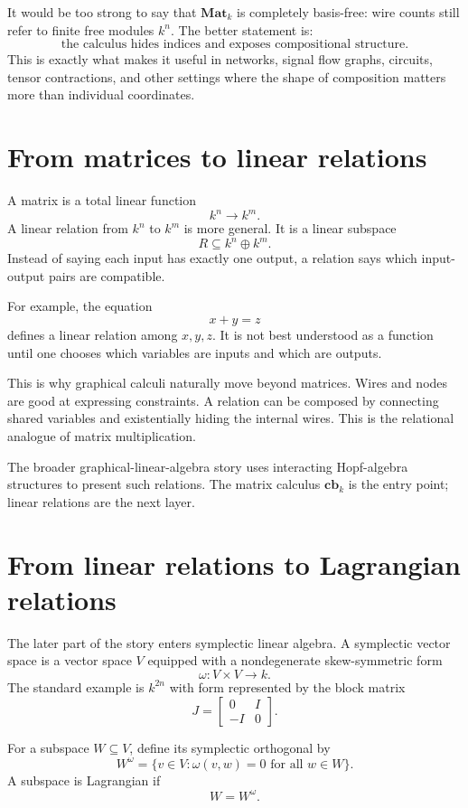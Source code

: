 It would be too strong to say that \(\mathbf{Mat}_k\) is completely basis-free: wire counts still refer to finite free modules \(k^n\).  The better statement is:
\[
  \text{the calculus hides indices and exposes compositional structure.}
\]
This is exactly what makes it useful in networks, signal flow graphs, circuits, tensor contractions, and other settings where the shape of composition matters more than individual coordinates.

\section{From matrices to linear relations}

A matrix is a total linear function
\[
  k^n\to k^m.
\]
A linear relation from \(k^n\) to \(k^m\) is more general.  It is a linear subspace
\[
  R\subseteq k^n\oplus k^m.
\]
Instead of saying each input has exactly one output, a relation says which input-output pairs are compatible.

For example, the equation
\[
  x+y=z
\]
defines a linear relation among \(x,y,z\).  It is not best understood as a function until one chooses which variables are inputs and which are outputs.

This is why graphical calculi naturally move beyond matrices.  Wires and nodes are good at expressing constraints.  A relation can be composed by connecting shared variables and existentially hiding the internal wires.  This is the relational analogue of matrix multiplication.

The broader graphical-linear-algebra story uses interacting Hopf-algebra structures to present such relations.  The matrix calculus \(\mathbf{cb}_k\) is the entry point; linear relations are the next layer.

\section{From linear relations to Lagrangian relations}

The later part of the story enters symplectic linear algebra.  A symplectic vector space is a vector space \(V\) equipped with a nondegenerate skew-symmetric form
\[
  \omega:V\times V\to k.
\]
The standard example is \(k^{2n}\) with form represented by the block matrix
\[
  J=\begin{bmatrix}
  0&I\\
  -I&0
  \end{bmatrix}.
\]

For a subspace \(W\subseteq V\), define its symplectic orthogonal by
\[
  W^\omega=\{v\in V:\omega(v,w)=0\text{ for all }w\in W\}.
\]
A subspace is Lagrangian if
\[
  W=W^\omega.
\]

